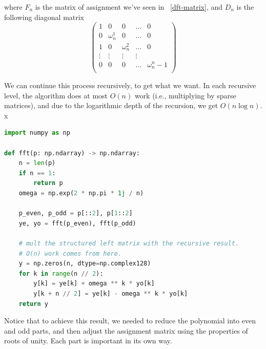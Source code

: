  where $F_n$ is the matrix of assignment we've seen in ~\ref{dft-matrix}, and 
 $D_n$ is the following diagonal matrix $$
 \begin{pmatrix}
  1 & 0 &0  & \dots& 0 \\
  0 & \omega_n^1 &0  & \dots& 0 \\
  1 & 0  &\omega_n^2  & \dots& 0 \\
  \vdots & \vdots & \vdots & \vdots &  \\
  0 & 0  &0  & \dots& \omega_n^n-1 \\
 \end{pmatrix} $$


 We can continue this process recursively, to get what we want.
 In each recursive level, the algorithm does at most $O(n)$ work (i.e., multiplying by sparse matrices),
  and due to the logarithmic depth of the recursion, we get $O(n\log{n})$.
x
\label{algorithm:fft}
  \begin{lstlisting}[language=Python,
    caption={fft algorithm in python}
  ]
import numpy as np

def fft(p: np.ndarray) -> np.ndarray:
    n = len(p)
    if n == 1:
        return p
    omega = np.exp(2 * np.pi * 1j / n)

    p_even, p_odd = p[::2], p[1::2] 
    ye, yo = fft(p_even), fft(p_odd)

    # mult the structured left matrix with the recursive result.
    # O(n) work comes from here.
    y = np.zeros(n, dtype=np.complex128)
    for k in range(n // 2):
        y[k] = ye[k] + omega ** k * yo[k]
        y[k + n // 2] = ye[k] - omega ** k * yo[k]
    return y
    \end{lstlisting}
    
    \begin{remark}[Summary]
      Notice that to achieve this result, we needed to reduce the polynomial into
      even and odd parts, and then adjust the assignment matrix using
      the properties of roots of unity. Each part is important in its own way.
    \end{remark}



